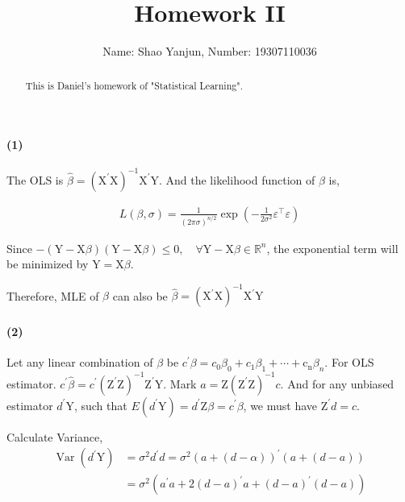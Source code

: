 \documentclass[11pt]{article}
\title{Homework II}
\author{Name: Shao Yanjun, Number: 19307110036}
\begin{document}
\maketitle

\begin{abstract}
This is Daniel's homework of  "Statistical Learning".
\end{abstract}

\paragraph{(1)}The OLS is $\hat{\beta}=\left(\mathrm{X}^{\prime} \mathrm{X}\right)^{-1} \mathrm{X}^{\prime} \mathrm{Y}$. And the likelihood function of $\beta$ is, 

\begin{align*}
	L(\beta, \sigma)=\frac{1}{(2 \pi \sigma)^{n/2}} \exp \left(-\frac{1}{2 \sigma^{2}} \varepsilon^{\top} \varepsilon\right)
\end{align*}

Since $-(\mathrm{Y}-\mathrm{X} \beta)(\mathrm{Y}-\mathrm{X} \beta) \leqslant 0, \quad \forall \mathrm{Y}-\mathrm{X} \beta \in \mathbb{R}^{n}$,
the exponential term will be minimized by $\mathrm{Y}=\mathrm{X} \beta$.

Therefore, MLE of $\beta$ can also be $\hat{\beta}=(\mathrm{X}^\prime \mathrm{X})^{-1} \mathrm{X}^{\prime} \mathrm{Y}$

\paragraph{(2)} Let any linear combination of $\beta$ be $c^{\prime} \beta=c_{0} \beta_{0}+c_{1} \beta_{1}+\cdots+\operatorname{c_n} \beta_{n}$. For OLS estimator. $c^{\prime} \hat{\beta}=c^{\prime}(\mathrm{Z}^\prime \mathrm{Z})^{-1} \mathrm{Z}^{\prime} \mathrm{Y}$. Mark $a=\mathrm{Z}\left(\mathrm{Z}^\prime\mathrm{Z}\right)^{-1} c$. And for any unbiased estimator $d^{\prime} \mathrm{Y}$, such that $E(d^{\prime} \mathrm{Y})=d^{\prime} \mathrm{Z} \beta=c^{\prime} \beta$, we must have $\mathrm{Z}^{\prime} d=c$.

Calculate Variance,
\begin{align*}
	\operatorname{Var}\left(d^{\prime} \mathrm{Y}\right)&=\sigma^{2} d^{\prime} d=\sigma^{2}(a+(d-\alpha))^{\prime}(a+(d-a))\\
	&=\sigma^{2}\left( a^{\prime} a+2(d-a)^{\prime} a+(d-a)^{\prime}(d-a) \right)
\end{align*} 
\end{document}
